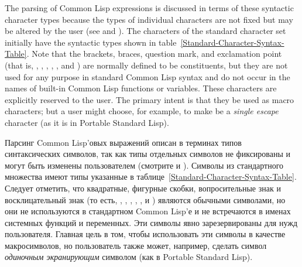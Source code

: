 The parsing of Common Lisp expressions is discussed in terms of these
syntactic character types because the types of individual characters
are not fixed
but may be altered by the user (see 
and ).
The characters of the standard character set initially have the
syntactic types shown in table~\ref{Standard-Character-Syntax-Table}.
Note that
the brackets, braces, question mark, and exclamation point
(that is, \cd{{\Xlbracket}}, \cd{{\Xrbracket}}, \cd{{\Xlbrace}},
\cd{{\Xrbrace}}, ,
and \cd{!}) are normally defined to be constituents, but they
are not used for any purpose in standard Common Lisp syntax and do not occur
in the names of built-in Common Lisp functions or variables.
These characters are explicitly reserved to the user.
The primary intent
is that they be used as macro characters; but a user might choose,
for example, to make \cd{!} be a \emph{single escape} character
(as it is in Portable Standard Lisp).

Парсинг Common Lisp'овых выражений описан в терминах типов синтаксических
символов, так как типы отдельных символов не фиксированы и могут быть изменены
пользователем (смотрите  и ).
Символы из стандартного множества имеют типы указанные в
таблице~\ref{Standard-Character-Syntax-Table}.  Следует отметить, что
квадратные, фигурные скобки, вопросительные знак и восклицательный знак (то
есть, \cd{{\Xlbracket}}, \cd{{\Xrbracket}}, \cd{{\Xlbrace}}, \cd{{\Xrbrace}},
, и \cd{!}) являются обычными символами, но они не используются в
стандартном Common Lisp'е и не встречаются в именах системных функций и
переменных.  Эти символы явно зарезервированы для нужд пользователя.  Главная
цель в том, чтобы использовать эти символы в качестве макросимволов, но
пользователь также может, например, сделать символ \cd{!} \emph{одиночным
  экранирующим} символом (как в Portable Standard Lisp).

